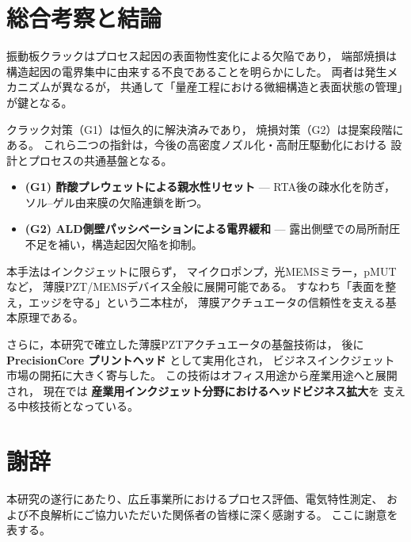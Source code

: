 \documentclass[conference]{IEEEtran}
\begin{document}
\section{総合考察と結論}
振動板クラックはプロセス起因の表面物性変化による欠陥であり，
端部焼損は構造起因の電界集中に由来する不良であることを明らかにした。
両者は発生メカニズムが異なるが，
共通して「量産工程における微細構造と表面状態の管理」が鍵となる。

クラック対策（G1）は恒久的に解決済みであり，
焼損対策（G2）は提案段階にある。
これら二つの指針は，今後の高密度ノズル化・高耐圧駆動化における
設計とプロセスの共通基盤となる。

\begin{itemize}
  \item \textbf{(G1) 酢酸プレウェットによる親水性リセット} —  
  RTA後の疎水化を防ぎ，ソル–ゲル由来膜の欠陥連鎖を断つ。
  \item \textbf{(G2) ALD側壁パッシベーションによる電界緩和} —  
  露出側壁での局所耐圧不足を補い，構造起因欠陥を抑制。
\end{itemize}

本手法はインクジェットに限らず，
マイクロポンプ，光MEMSミラー，pMUTなど，
薄膜PZT/MEMSデバイス全般に展開可能である。
すなわち「表面を整え，エッジを守る」という二本柱が，
薄膜アクチュエータの信頼性を支える基本原理である。

\vspace{1em}
さらに，本研究で確立した薄膜PZTアクチュエータの基盤技術は，
後に \textbf{PrecisionCore プリントヘッド} として実用化され，
ビジネスインクジェット市場の開拓に大きく寄与した。
この技術はオフィス用途から産業用途へと展開され，
現在では \textbf{産業用インクジェット分野におけるヘッドビジネス拡大}を
支える中核技術となっている。

\section*{謝辞}
本研究の遂行にあたり、広丘事業所におけるプロセス評価、電気特性測定、  
および不良解析にご協力いただいた関係者の皆様に深く感謝する。  
ここに謝意を表する。
\end{document}
